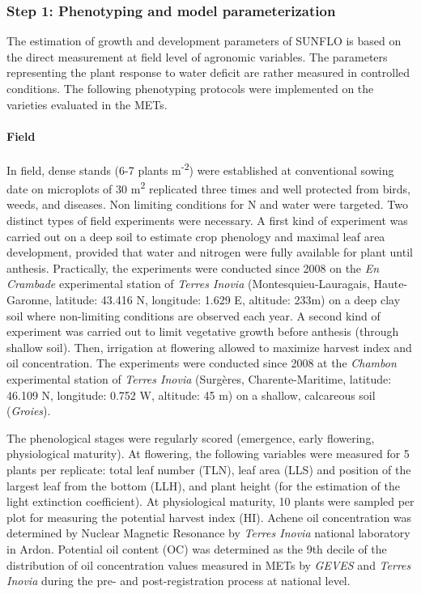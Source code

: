 \documentclass[a4paper]{article}
\let\oldparagraph\paragraph
\renewcommand{\paragraph}[1]{\oldparagraph{#1}\mbox{}}
\begin{document}
\subsubsection{Step 1: Phenotyping and model
parameterization}\label{step-1-phenotyping-and-model-parameterization}

The estimation of growth and development parameters of SUNFLO is based
on the direct measurement at field level of agronomic variables. The
parameters representing the plant response to water deficit are rather
measured in controlled conditions. The following phenotyping protocols
were implemented on the varieties evaluated in the METs.

\paragraph{Field}\label{field}

In field, dense stands (6-7 plants m\textsuperscript{-2}) were
established at conventional sowing date on microplots of 30
m\textsuperscript{2} replicated three times and well protected from
birds, weeds, and diseases. Non limiting conditions for N and water were
targeted. Two distinct types of field experiments were necessary. A
first kind of experiment was carried out on a deep soil to estimate crop
phenology and maximal leaf area development, provided that water and
nitrogen were fully available for plant until anthesis. Practically, the
experiments were conducted since 2008 on the \emph{En Crambade}
experimental station of \emph{Terres Inovia} (Montesquieu-Lauragais,
Haute-Garonne, latitude: 43.416 N, longitude: 1.629 E, altitude: 233m)
on a deep clay soil where non-limiting conditions are observed each
year. A second kind of experiment was carried out to limit vegetative
growth before anthesis (through shallow soil). Then, irrigation at
flowering allowed to maximize harvest index and oil concentration. The
experiments were conducted since 2008 at the \emph{Chambon} experimental
station of \emph{Terres Inovia} (Surgères, Charente-Maritime, latitude:
46.109 N, longitude: 0.752 W, altitude: 45 m) on a shallow, calcareous
soil (\emph{Groies}).

The phenological stages were regularly scored (emergence, early
flowering, physiological maturity). At flowering, the following
variables were measured for 5 plants per replicate: total leaf number
(TLN), leaf area (LLS) and position of the largest leaf from the bottom
(LLH), and plant height (for the estimation of the light extinction
coefficient). At physiological maturity, 10 plants were sampled per plot
for measuring the potential harvest index (HI). Achene oil concentration
was determined by Nuclear Magnetic Resonance by \emph{Terres Inovia}
national laboratory in Ardon. Potential oil content (OC) was determined
as the 9th decile of the distribution of oil concentration values
measured in METs by \emph{GEVES} and \emph{Terres Inovia} during the
pre- and post-registration process at national level.
\end{document}
